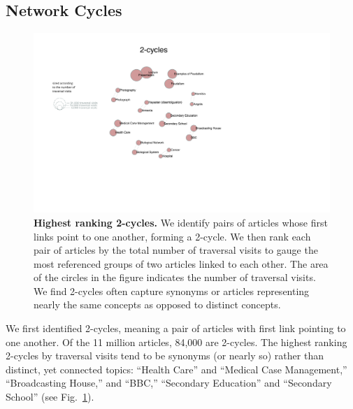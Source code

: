 \documentclass[pre,twocolumn,twoside,superscriptaddress,floatfix, aps, 10pt]{revtex4-1}
\begin{document}
\subsection{Network Cycles}

\begin{figure}[tp!]
  \includegraphics[width=\textwidth]{graphics/2_cycles.pdf}
  \caption{
    \textbf{Highest ranking 2-cycles.}
We identify pairs of articles whose first links point to one another, forming
a 2-cycle. We then rank each pair of articles by the total number of 
traversal visits to gauge the most referenced groups of two articles linked
to each other. The area of the circles in the figure indicates the number of traversal visits. We find 2-cycles often capture synonyms or articles representing nearly the 
same concepts as opposed to distinct concepts.}
  \label{fig:2-cycles}
\end{figure}
We first identified 2-cycles, meaning a pair of articles with first link pointing to one another.
Of the 11 million articles, 84,000 are 2-cycles. 
The highest ranking 2-cycles by traversal visits tend to be synonyms (or nearly so) rather than distinct, yet connected topics:
``Health Care'' and ``Medical Case Management,'' ``Broadcasting House,'' and ``BBC,'' ``Secondary Education'' and ``Secondary School'' 
(see Fig.~\ref{fig:2-cycles}).
\end{document}
